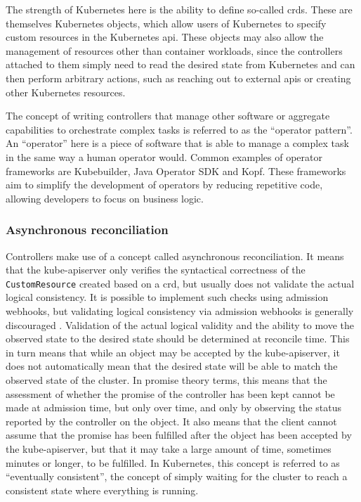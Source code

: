 The strength of Kubernetes here is the ability to define so-called \glspl{crd}.
These are themselves Kubernetes objects, which allow users of Kubernetes to specify custom resources in the Kubernetes \gls{api}.
These objects may also allow the management of resources other than container workloads, since the controllers attached to them simply need to read the desired state from Kubernetes and can then perform arbitrary actions, such as reaching out to external \glspl{api} or creating other Kubernetes resources.
\parencite{k8scustomresources, k8scontrollers}

The concept of writing controllers that manage other software or aggregate capabilities to orchestrate complex tasks is referred to as the \enquote{operator pattern}.
An \enquote{operator} here is a piece of software that is able to manage a complex task in the same way a human operator would.
Common examples of operator frameworks are Kubebuilder, Java Operator SDK and Kopf.
These frameworks aim to simplify the development of operators by reducing repetitive code, allowing developers to focus on business logic.
\parencite{k8soperators}

\subsubsection{Asynchronous reconciliation}
Controllers make use of a concept called asynchronous reconciliation.
It means that the kube-apiserver only verifies the syntactical correctness of the \texttt{CustomResource} created based on a \gls{crd}, but usually does not validate the actual logical consistency.
It is possible to implement such checks using admission webhooks, but validating logical consistency via admission webhooks is generally discouraged \parencite{k8sadmissionwebhooksgoodpractices}.
Validation of the actual logical validity and the ability to move the observed state to the desired state should be determined at reconcile time.
This in turn means that while an object may be accepted by the kube-apiserver, it does not automatically mean that the desired state will be able to match the observed state of the cluster.
In promise theory terms, this means that the assessment of whether the promise of the controller has been kept cannot be made at admission time, but only over time, and only by observing the status reported by the controller on the object.
It also means that the client cannot assume that the promise has been fulfilled after the object has been accepted by the kube-apiserver, but that it may take a large amount of time, sometimes minutes or longer, to be fulfilled.
In Kubernetes, this concept is referred to as \enquote{eventually consistent}, the concept of simply waiting for the cluster to reach a consistent state where everything is running.
\parencite{k8soperators, k8scustomresources, k8scontrollers, k8sdynamicadmissioncontrol, k8sadmissioncontrol}

